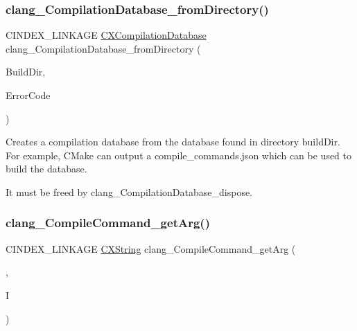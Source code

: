 \subsubsection{\texorpdfstring{clang\+\_\+\+Compilation\+Database\+\_\+from\+Directory()}{clang\_CompilationDatabase\_fromDirectory()}}
{\footnotesize\ttfamily C\+I\+N\+D\+E\+X\+\_\+\+L\+I\+N\+K\+A\+GE \mbox{\hyperlink{group__COMPILATIONDB_gaecfc6e98d321bc436061472f4e4f84b2}{C\+X\+Compilation\+Database}} clang\+\_\+\+Compilation\+Database\+\_\+from\+Directory (\begin{DoxyParamCaption}\item[{const char $\ast$}]{Build\+Dir,  }\item[{\mbox{\hyperlink{group__COMPILATIONDB_gaf3d54e270b01e34f9db65579014255f8}{C\+X\+Compilation\+Database\+\_\+\+Error}} $\ast$}]{Error\+Code }\end{DoxyParamCaption})}



Creates a compilation database from the database found in directory build\+Dir. For example, C\+Make can output a compile\+\_\+commands.\+json which can be used to build the database. 

It must be freed by {\ttfamily clang\+\_\+\+Compilation\+Database\+\_\+dispose}. \mbox{\label{group__COMPILATIONDB_ga6b19abe9ced14c29cd6720b93b19194b}} 
\subsubsection{\texorpdfstring{clang\+\_\+\+Compile\+Command\+\_\+get\+Arg()}{clang\_CompileCommand\_getArg()}}
{\footnotesize\ttfamily C\+I\+N\+D\+E\+X\+\_\+\+L\+I\+N\+K\+A\+GE \mbox{\hyperlink{structCXString}{C\+X\+String}} clang\+\_\+\+Compile\+Command\+\_\+get\+Arg (\begin{DoxyParamCaption}\item[{\mbox{\hyperlink{group__COMPILATIONDB_gae59272595ab7fa4c1ed03348c56264bf}{C\+X\+Compile\+Command}}}]{,  }\item[{unsigned}]{I }\end{DoxyParamCaption})}



